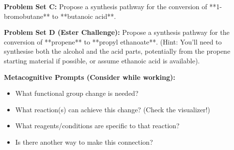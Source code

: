 \documentclass[11pt, a4paper]{article}
\begin{document}
\textbf{Problem Set C:}
Propose a synthesis pathway for the conversion of **1-bromobutane** to **butanoic acid**.

\vspace{1cm} \hrulefill \vspace{1cm}

\textbf{Problem Set D (Ester Challenge):}
Propose a synthesis pathway for the conversion of **propene** to **propyl ethanoate**. (Hint: You'll need to synthesise both the alcohol and the acid parts, potentially from the propene starting material if possible, or assume ethanoic acid is available).

\vspace{1cm} \hrulefill \vspace{1cm}

\textbf{Metacognitive Prompts (Consider while working):}
\begin{itemize}
    \item What functional group change is needed?
    \item What reaction(s) can achieve this change? (Check the visualizer!)
    \item What reagents/conditions are specific to that reaction?
    \item Is there another way to make this connection?
\end{itemize}
\end{document}
